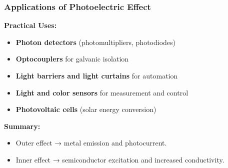 \begin{frame}
	\frametitle{Applications of Photoelectric Effect}
    \textbf{Practical Uses:}
    \begin{itemize}
        \item \textbf{Photon detectors} (photomultipliers, photodiodes)
        \item \textbf{Optocouplers} for galvanic isolation
        \item \textbf{Light barriers and light curtains} for automation
        \item \textbf{Light and color sensors} for measurement and control
        \item \textbf{Photovoltaic cells} (solar energy conversion)
    \end{itemize}
    \textbf{Summary:}
    \begin{itemize}
        \item Outer effect → metal emission and photocurrent.
        \item Inner effect → semiconductor excitation and increased conductivity.
    \end{itemize}
\end{frame}



